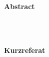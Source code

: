 \thispagestyle{noheader}
\setlength{\columnsep}{1cm}

\begin{multicols}{2}
	\begin{large}
		\textbf{Abstract} \\ \\
	\end{large}
	\blindtext
	\columnbreak \\
	\begin{large}
		\textbf{Kurzreferat} \\ \\
	\end{large}
	\blindtext
\end{multicols}

\newpage